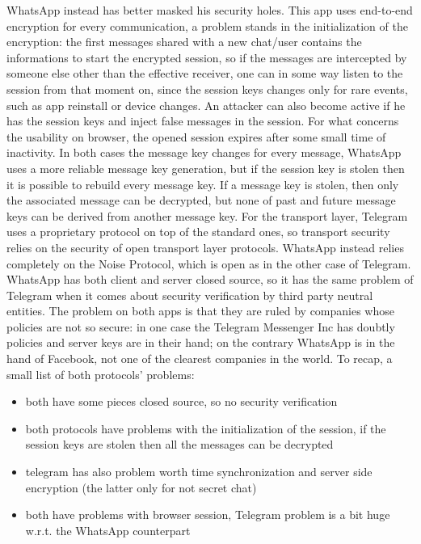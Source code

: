 \documentclass{article}
\begin{document}
WhatsApp instead has better masked his security holes. This app uses end-to-end encryption for every communication, a problem stands in the initialization of the encryption: the first messages shared with a new chat/user contains the informations to start the encrypted session, so if the messages are intercepted by someone else other than the effective receiver, one can in some way listen to the session from that moment on, since the session keys changes only for rare events, such as app reinstall or device changes. An attacker can also become active if he has the session keys and inject false messages in the session. For what concerns the usability on browser, the opened session expires after some small time of inactivity.\newline
In both cases the message key changes for every message, WhatsApp uses a more reliable message key generation, but if the session key is stolen then it is possible to rebuild every message key. If a message key is stolen, then only the associated message can be decrypted, but none of past and future message keys can be derived from another message key.\newline
For the transport layer, Telegram uses a proprietary protocol on top of the standard ones, so transport security relies on the security of open transport layer protocols. WhatsApp instead relies completely on the Noise Protocol, which is open as in the other case of Telegram.\newline
WhatsApp has both client and server closed source, so it has the same problem of Telegram when it comes about security verification by third party neutral entities.\newline
The problem on both apps is that they are ruled by companies whose policies are not so secure: in one case the Telegram Messenger Inc has doubtly policies \cite{tel_policy} and server keys are in their hand; on the contrary WhatsApp \cite{whats_policy} is in the hand of Facebook, not one of the clearest companies in the world.\newline
To recap, a small list of both protocols' problems:

\begin{itemize}
	\item both have some pieces closed source, so no security verification
	\item both protocols have problems with the initialization of the session, if the session keys are stolen then all the messages can be decrypted
	\item telegram has also problem worth time synchronization and server side encryption (the latter only for not secret chat) 
	\item both have problems with browser session, Telegram problem is a bit huge w.r.t. the WhatsApp counterpart
\end{itemize}
\end{document}
